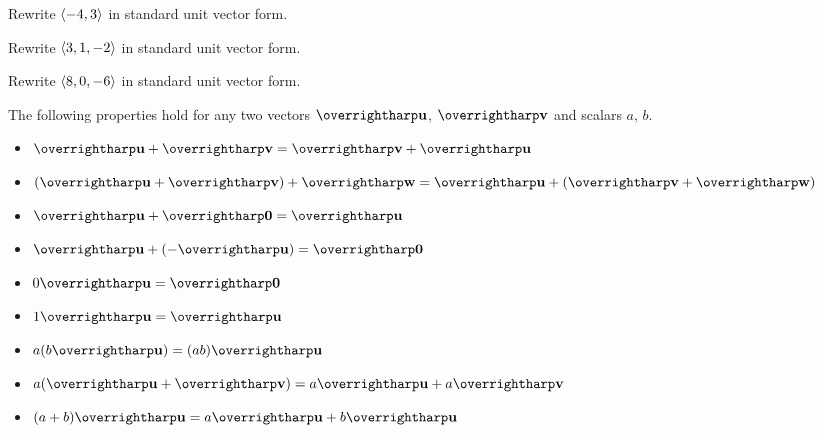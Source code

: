 \documentclass[letterpaper, twoside, 12pt]{book}
\begin{document}
          \begin{problem}
            Rewrite $\langle-4,3\rangle$ in standard unit vector form.
          \end{problem}

          \begin{solution}

          \end{solution}

          \begin{problem}
            Rewrite $\langle3,1,-2\rangle$ in standard unit vector form.
          \end{problem}

          \begin{solution}

          \end{solution}

          \begin{problem}
            Rewrite $\langle8,0,-6\rangle$ in standard unit vector form.
          \end{problem}

          \begin{solution}

          \end{solution}



\begin{theorem}
The following properties hold for any two vectors $\harpvec{u}$, $\harpvec{v}$
and scalars $a$, $b$.
  \begin{itemize}
  \item $\harpvec{u}+\harpvec{v} = \harpvec{v}+\harpvec{u}$
  \item $(\harpvec{u}+\harpvec{v})+\harpvec{w} = \harpvec{u}+(\harpvec{v}+\harpvec{w})$
  \item $\harpvec{u}+\harpvec{0} = \harpvec{u}$
  \item $\harpvec{u}+(-\harpvec{u}) = \harpvec{0}$
  \item $0\harpvec{u} = \harpvec{0}$
  \item $1\harpvec{u} = \harpvec{u}$
  \item $a(b\harpvec{u}) = (ab)\harpvec{u}$
  \item $a(\harpvec{u} + \harpvec{v}) = a\harpvec{u} + a\harpvec{v}$
  \item $(a+b)\harpvec{u} = a\harpvec{u} + b\harpvec{u}$
  \end{itemize}
\end{theorem}
\end{document}
